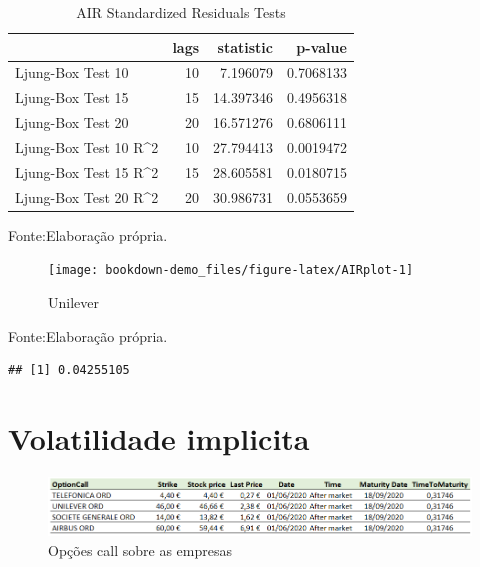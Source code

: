 \documentclass[
  12pt,
  a4paper,
  openany]{book}
\begin{document}
\begin{table}[!h]

\caption{\label{tab:unnamed-chunk-26}AIR Standardized Residuals Tests}
\centering
\begin{tabular}[t]{lrrr}
\toprule
  & lags & statistic & p-value\\
\midrule
Ljung-Box Test 10 & 10 & 7.196079 & 0.7068133\\
Ljung-Box Test 15 & 15 & 14.397346 & 0.4956318\\
Ljung-Box Test 20 & 20 & 16.571276 & 0.6806111\\
Ljung-Box Test 10 R\textasciicircum{}2 & 10 & 27.794413 & 0.0019472\\
Ljung-Box Test 15 R\textasciicircum{}2 & 15 & 28.605581 & 0.0180715\\
\addlinespace
Ljung-Box Test 20 R\textasciicircum{}2 & 20 & 30.986731 & 0.0553659\\
\bottomrule
\end{tabular}
\end{table}
\FloatBarrier
\centering

Fonte:Elaboração própria.

\justifying
\bigskip
\begin{figure}

{\centering \texttt{[image: bookdown-demo\_files/figure-latex/AIRplot-1]} 

}

\caption{Unilever}\label{fig:AIRplot}
\end{figure}
\FloatBarrier
\centering

Fonte:Elaboração própria.

\justifying
\bigskip

\begin{verbatim}
## [1] 0.04255105
\end{verbatim}

\hypertarget{volatilidade-implicita}{%
\section{Volatilidade implicita}\label{volatilidade-implicita}}

\begin{figure}

{\centering \includegraphics[width=0.7\linewidth]{image/opcao} 

}

\caption{Opções call sobre as empresas }\label{fig:opcao}
\end{figure}
\FloatBarrier
\centering
\end{document}
